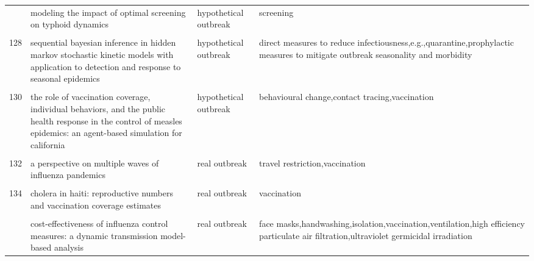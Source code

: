 \documentclass[
]{article}
\begin{document}
\begin{landscape}
\begin{longtable}{l>{\raggedright\arraybackslash}p{3cm}l>{\raggedright\arraybackslash}p{8cm}}
\addlinespace
126 & modeling the impact of optimal screening on typhoid dynamics & hypothetical outbreak & screening\\
\cellcolor{gray!6}{127} & \cellcolor{gray!6}{modeling the influence of environment and intervention oncholera in haiti} & \cellcolor{gray!6}{real outbreak} & \cellcolor{gray!6}{vaccination}\\
128 & sequential bayesian inference in hidden markov stochastic kinetic models with application to detection and response to seasonal epidemics & hypothetical outbreak & direct measures to reduce infectiousness,e.g.,quarantine,prophylactic measures to mitigate outbreak seasonality and morbidity\\
\cellcolor{gray!6}{129} & \cellcolor{gray!6}{simulating optimal vaccination times during cholera outbreaks} & \cellcolor{gray!6}{hypothetical outbreak} & \cellcolor{gray!6}{vaccination}\\
130 & the role of vaccination coverage, individual behaviors, and the public health response in the control of measles epidemics: an agent-based simulation for california & hypothetical outbreak & behavioural change,contact tracing,vaccination\\
\addlinespace
\cellcolor{gray!6}{131} & \cellcolor{gray!6}{time is (still) of the essence: quantifying the impact of emergency meningitis vaccination response in katsina state, nigeria} & \cellcolor{gray!6}{real outbreak} & \cellcolor{gray!6}{vaccination}\\
132 & a perspective on multiple waves of influenza pandemics & real outbreak & travel restriction,vaccination\\
\cellcolor{gray!6}{133} & \cellcolor{gray!6}{an optimal control problem arising from a dengue disease transmission model} & \cellcolor{gray!6}{hypothetical outbreak} & \cellcolor{gray!6}{treatment,mosquito repellent}\\
134 & cholera in haiti: reproductive numbers and vaccination coverage estimates & real outbreak & vaccination\\
\cellcolor{gray!6}{135} & \cellcolor{gray!6}{comparing control strategies against foot-and-mouth disease: will vaccination be cost-effective in denmark?} & \cellcolor{gray!6}{hypothetical outbreak} & \cellcolor{gray!6}{vaccination,depopulation of detected herds,protection,surveillance zones,movement tracing,national standstill}\\
\addlinespace
136 & cost-effectiveness of influenza control measures: a dynamic transmission model-based analysis & real outbreak & face masks,handwashing,isolation,vaccination,ventilation,high efficiency particulate air filtration,ultraviolet germicidal irradiation\\

\end{longtable}
\end{landscape}
\end{document}
